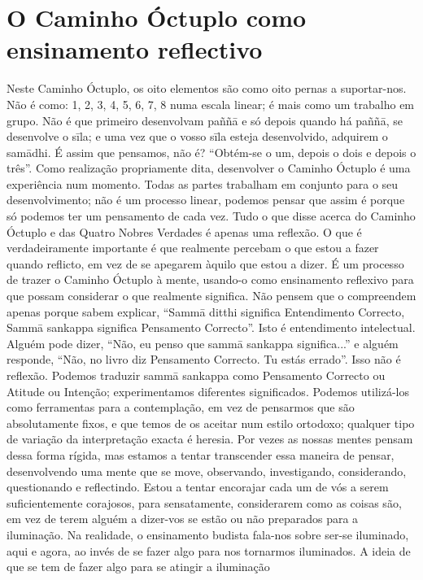 \section{O Caminho Óctuplo como ensinamento reflectivo}

Neste Caminho Óctuplo, os oito elementos são como oito
pernas a suportar-nos. Não é como: 1, 2, 3, 4, 5, 6, 7, 8 numa
escala linear; é mais como um trabalho em grupo. Não é que
primeiro desenvolvam paññā e só depois quando há paññā, se
desenvolve o sīla; e uma vez que o vosso sīla esteja desenvolvido, adquirem o samādhi. É assim que pensamos, não é?
“Obtém-se o um, depois o dois e depois o três”. Como realização 
propriamente dita, desenvolver o Caminho Óctuplo é
uma experiência num momento. Todas as partes trabalham
em conjunto para o seu desenvolvimento; não é um processo
linear, podemos pensar que assim é porque só podemos ter um
pensamento de cada vez.
Tudo o que disse acerca do Caminho Óctuplo e das
Quatro Nobres Verdades é apenas uma reflexão. O que é
verdadeiramente importante é que realmente percebam o que
estou a fazer quando reflicto, em vez de se apegarem àquilo
que estou a dizer. É um processo de trazer o Caminho Óctuplo
à mente, usando-o como ensinamento reflexivo para que
possam considerar o que realmente significa. Não pensem
que o compreendem apenas porque sabem explicar, “Sammā
ditthi significa Entendimento Correcto, Sammā sankappa significa Pensamento Correcto”. Isto é entendimento intelectual.
Alguém pode dizer, “Não, eu penso que sammā sankappa significa...” e alguém responde, “Não, no livro diz Pensamento
Correcto. Tu estás errado”. Isso não é reflexão.
Podemos traduzir sammā sankappa como Pensamento
Correcto ou Atitude ou Intenção; experimentamos diferentes
significados. Podemos utilizá-los como ferramentas para a
contemplação, em vez de pensarmos que são absolutamente
fixos, e que temos de os aceitar num estilo ortodoxo; qualquer
tipo de variação da interpretação exacta é heresia. Por vezes
as nossas mentes pensam dessa forma rígida, mas estamos a
tentar transcender essa maneira de pensar, desenvolvendo uma
mente que se move, observando, investigando, considerando,
questionando e reflectindo.
Estou a tentar encorajar cada um de vós a serem
suficientemente corajosos, para sensatamente, considerarem
como as coisas são, em vez de terem alguém a dizer-vos se
estão ou não preparados para a iluminação. Na realidade, o
ensinamento budista fala-nos sobre ser-se iluminado, aqui e
agora, ao invés de se fazer algo para nos tornarmos iluminados.
A ideia de que se tem de fazer algo para se atingir a iluminação
